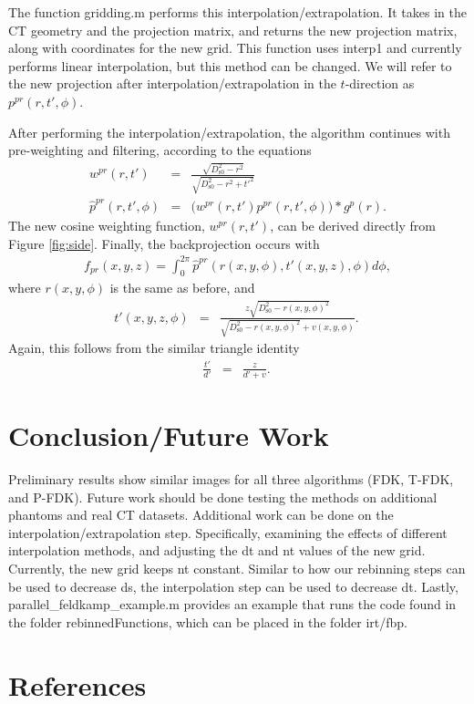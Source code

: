 \documentclass[12pt]{elsarticle}
\begin{document}
The function gridding.m performs this interpolation/extrapolation. It takes in the CT geometry and the
projection matrix, and returns the new projection matrix, along with coordinates for the new grid. This
function uses interp1 and currently performs linear interpolation, but this method can be changed.
We will refer to the new projection after interpolation/extrapolation in the $t$-direction as $p^{pr}(r,t',\phi)$.

After performing the interpolation/extrapolation, the algorithm continues with pre-weighting
and filtering, according to the equations
\begin{eqnarray*}
w^{pr}(r,t') &=& \frac{\sqrt{D_\mathrm{s0}^2-r^2}}{\sqrt{D_\mathrm{s0}^2 -r^2+ t'^2}} \\
\hat{p}^{pr}(r,t',\phi) &=& \Big(w^{pr}(r,t') p^{pr}(r,t',\phi)\Big) * g^p(r).
\end{eqnarray*}
The new cosine weighting function, $w^{pr}(r,t')$, can be derived directly from Figure \ref{fig:side}. 
Finally, the backprojection occurs with
\begin{eqnarray*}
f_{pr}(x,y,z) = \int_0^{2\pi} \hat{p}^{pr}(r(x,y,\phi),t'(x,y,z),\phi) d\phi,
\end{eqnarray*}
where $r(x,y,\phi)$ is the same as before, and
\begin{eqnarray*}
t'(x,y,z,\phi) &=& \frac{z\sqrt{D_\mathrm{s0}^2-r(x,y,\phi)^2}}{\sqrt{D_\mathrm{s0}^2-r(x,y,\phi)^2}+v(x,y,\phi)}. \
\end{eqnarray*}
Again, this follows from the similar triangle identity
\begin{eqnarray*}
\frac{t'}{d'} &=& \frac{z}{d'+v}. \
\end{eqnarray*}

\section{Conclusion/Future Work}
Preliminary results show similar images for all three algorithms (FDK, T-FDK, and P-FDK). Future work should
be done testing the methods on additional phantoms and real CT datasets. Additional work can be done 
on the interpolation/extrapolation step. Specifically, examining the effects of different interpolation 
methods, and adjusting the dt and nt values of the new grid. Currently, the new grid keeps nt constant. Similar to how our rebinning steps can be used to decrease ds, the interpolation step can be used to decrease
dt. Lastly, parallel\_feldkamp\_example.m provides an example that runs the code found in the folder rebinnedFunctions, which can be placed in the folder irt/fbp. 


\section{References}


\end{document}
